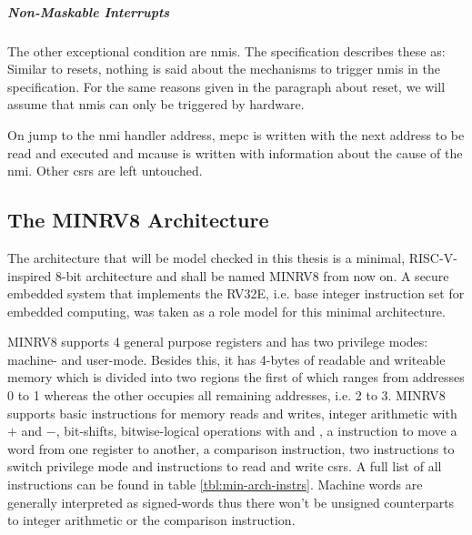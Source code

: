 \subparagraph{Non-Maskable Interrupts}
The other exceptional condition are \glspl{nmi}.
The specification describes these as: 
Similar to resets, nothing is said about the mechanisms to trigger \glspl{nmi} in the specification.
For the same reasons given in the paragraph about reset, we will assume that \glspl{nmi} can only be triggered by hardware.

On jump to the \gls{nmi} handler address, \gls{mepc} is written with the next address to be read and executed and \gls{mcause} is written with information about the cause of the \gls{nmi}.
Other \glspl{csr} are left untouched.



\subsection{The MINRV8 Architecture}
\label{sec:minrv8}

The architecture that will be model checked in this thesis is a minimal, RISC-V-inspired 8-bit architecture and shall be named MINRV8 from now on.
A secure embedded system that implements the RV32E, i.e. base integer instruction set for embedded computing, was taken as a role model for this minimal architecture.

MINRV8 supports 4 general purpose registers and has two privilege modes: machine- and user-mode.
Besides this, it has 4-bytes of readable and writeable memory which is divided into two regions the first of which ranges from addresses 0 to 1 whereas the other occupies all remaining addresses, i.e. 2 to 3.
MINRV8 supports basic instructions for memory reads and writes, integer arithmetic with $ + $ and $ - $, bit-shifts, bitwise-logical operations with  and , a  instruction to move a word from one register to another, a comparison instruction, two instructions to switch privilege mode and instructions to read and write \glspl{csr}.
A full list of all instructions can be found in table \ref{tbl:min-arch-instrs}.
Machine words are generally interpreted as signed-words thus there won't be unsigned counterparts to integer arithmetic or the comparison instruction.

